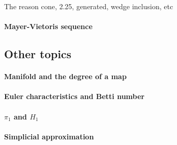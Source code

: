 \documentclass[11pt]{article}
\theoremstyle{definition}
\theoremstyle{plain}
\begin{document}
The reason cone, 2.25, generated, wedge inclusion, etc

\paragraph{Mayer-Vietoris sequence}

\subsection{Other topics}

\paragraph{Manifold and the degree of a map}

\paragraph{Euler characteristics and Betti number}

\paragraph{$\pi_1$ and $H_1$}

\paragraph{Simplicial approximation}
\end{document}
